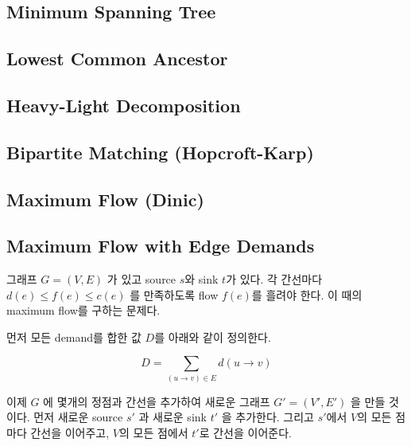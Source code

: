 \documentclass[8pt,landscape,a4paper,twocolumn]{article}
\begin{document}
% 

\subsection{Minimum Spanning Tree}


\subsection{Lowest Common Ancestor}


\subsection{Heavy-Light Decomposition}


\subsection{Bipartite Matching (Hopcroft-Karp)}


\subsection{Maximum Flow (Dinic)}


\subsection{Maximum Flow with Edge Demands}

그래프 $G=(V,E)$ 가 있고 source $s$와 sink $t$가 있다. 각 간선마다 $d(e) \leq f(e) \leq c(e)$ 를 만족하도록 flow $f(e)$를 흘려야 한다. 이 때의 maximum flow를 구하는 문제다.

먼저 모든 demand를 합한 값 $D$를 아래와 같이 정의한다.

\begin{displaymath}
D = \sum_{(u \to v) \in E} d(u \to v)
\end{displaymath}

이제 $G$ 에 몇개의 정점과 간선을 추가하여 새로운 그래프 $G'=(V',E')$ 을 만들 것이다. 먼저 새로운 source $s'$ 과 새로운 sink $t'$ 을 추가한다. 그리고 $s'$에서 $V$의 모든 점마다 간선을 이어주고, $V$의 모든 점에서 $t'$로 간선을 이어준다.
\end{document}
